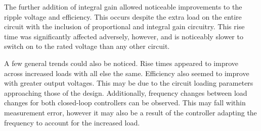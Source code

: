 The further addition of integral gain allowed noticeable improvements to the ripple voltage and 
efficiency. This occurs despite the extra load on the entire circuit with the inclusion of 
proportional and integral gain circuitry. This rise time was significantly affected adversely, however,
and is noticeably slower to switch on to the rated voltage than any other circuit. 

A few general trends could also be noticed. Rise times appeared to improve across increased loads
with all else the same. Efficiency also seemed to improve with greater output voltages. This may 
be due to the circuit loading parameters approaching those of the design. Additionally, 
frequency changes between load changes for both closed-loop controllers can be observed. 
This may fall within measurement error, however it may also be a result of the controller adapting 
the frequency to account for the increased load.